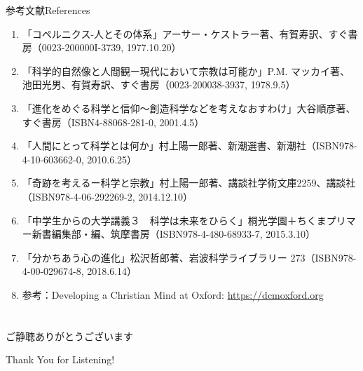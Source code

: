 \documentclass[10pt, dvipdfmx]{beamer}
\begin{document}
\begin{frame}{参考文献}{References}

\begin{enumerate}
\item 「コペルニクス-人とその体系」アーサー・ケストラー著、有賀寿訳、すぐ書房（0023-200000I-3739, 1977.10.20）
\item 「科学的自然像と人間観ー現代において宗教は可能か」P.M. マッカイ著、池田光男、有賀寿訳、すぐ書房（0023-200038-3937, 1978.9.5）
\item 「進化をめぐる科学と信仰〜創造科学などを考えなおすわけ」大谷順彦著、すぐ書房（ISBN4-88068-281-0, 2001.4.5）
\item 「人間にとって科学とは何か」村上陽一郎著、新潮選書、新潮社（ISBN978-4-10-603662-0, 2010.6.25）
\item 「奇跡を考えるー科学と宗教」村上陽一郎著、講談社学術文庫2259、講談社（ISBN978-4-06-292269-2, 2014.12.10）
\item 「中学生からの大学講義３　科学は未来をひらく」桐光学園＋ちくまプリマー新書編集部・編、筑摩書房（ISBN978-4-480-68933-7, 2015.3.10）
\item 「分かちあう心の進化」松沢哲郎著、岩波科学ライブラリー 273（ISBN978-4-00-029674-8, 2018.6.14）
\item 参考：Developing a Christian Mind at Oxford: \url{https://dcmoxford.org}
\end{enumerate}

\end{frame}

\section{}
\begin{frame}
\frametitle{}
\framesubtitle{}

\begin{center}
{\LARGE ご静聴ありがとうございます

\bigskip
Thank You for Listening!}

\end{center}
\end{frame}
\end{document}
